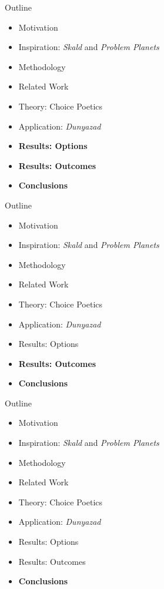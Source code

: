 \documentclass[xcolor=x11names]{beamer}
\def\dunyazad/{\textit{Dunyazad}}
\def\skald/{\textit{Skald}}
\def\problemplanets/{\textit{Problem Planets}}
\begin{document}
\begin{frame}{Outline}
  \begin{itemize}
    \item Motivation
    \item Inspiration: \skald/ and \problemplanets/
    \item Methodology
    \item Related Work
    \item Theory: Choice Poetics
    \item Application: \dunyazad/
    \item \textbf{Results: Options}
    \item \textbf{Results: Outcomes}
    \item \textbf{Conclusions}
  \end{itemize}
\end{frame}

\begin{frame}{Outline}
  \begin{itemize}
    \item Motivation
    \item Inspiration: \skald/ and \problemplanets/
    \item Methodology
    \item Related Work
    \item Theory: Choice Poetics
    \item Application: \dunyazad/
    \item Results: Options
    \item \textbf{Results: Outcomes}
    \item \textbf{Conclusions}
  \end{itemize}
\end{frame}

\begin{frame}{Outline}
  \begin{itemize}
    \item Motivation
    \item Inspiration: \skald/ and \problemplanets/
    \item Methodology
    \item Related Work
    \item Theory: Choice Poetics
    \item Application: \dunyazad/
    \item Results: Options
    \item Results: Outcomes
    \item \textbf{Conclusions}
  \end{itemize}
\end{frame}
\end{document}
